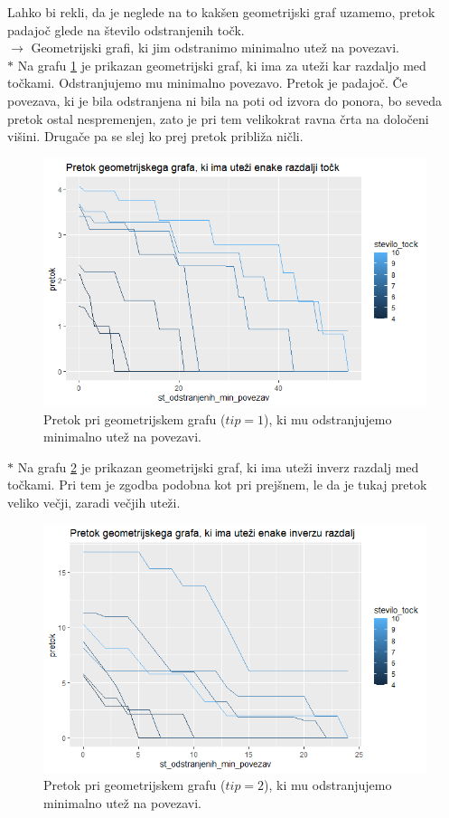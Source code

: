 \documentclass[a4paper]{article}
\begin{document}
Lahko bi rekli, da je neglede na to kakšen geometrijski graf uzamemo, pretok padajoč glede na število odstranjenih točk. \\

$\rightarrow $  Geometrijski grafi, ki jim odstranimo minimalno utež na povezavi. \\

$\ast$ Na grafu \ref{fig9} je prikazan geometrijski graf, ki ima za uteži kar razdaljo med točkami. Odstranjujemo mu minimalno povezavo. Pretok je padajoč. Če povezava, ki je bila odstranjena ni bila na poti od izvora do ponora, bo seveda pretok ostal nespremenjen, zato je pri tem velikokrat ravna črta na določeni višini. Drugače pa se slej ko prej pretok približa ničli. 
\begin{figure}[H]
\centerline{\includegraphics[scale=.5]{p8.PNG}}
\caption{Pretok pri geometrijskem grafu ($tip = 1$), ki mu odstranjujemo minimalno utež na povezavi.}
\label{fig9}
\end{figure}

$\ast$ Na grafu \ref{fig10} je prikazan geometrijski graf, ki ima uteži inverz razdalj med točkami. Pri tem je zgodba podobna kot pri prejšnem, le da je tukaj pretok veliko večji, zaradi večjih uteži.
\begin{figure}[H]
\centerline{\includegraphics[scale=.5]{p7.PNG}}
\caption{Pretok pri geometrijskem grafu ($tip = 2$), ki mu odstranjujemo minimalno utež na povezavi.}
\label{fig10}
\end{figure}
\end{document}
